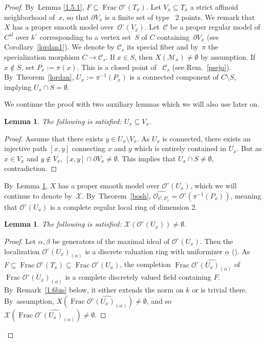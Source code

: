 \documentclass[10pt]{amsart}
\newcommand{\al}{\mathrm{al}}
\DeclareMathOperator{\Frac}{Frac}
\let\backslash\setminus
\newtheorem{lm}[thm]{Lemma}
\theoremstyle{definition}
\begin{document}
\begin{proof} By~Lemma \ref{1.5.1}, $F \subseteq \Frac \mathcal{O}^{\circ}(T_x)$. Let $V_x \subseteq T_x$ a strict affinoid neighborhood of~$x$, so that $\partial{V_x}$ is a finite set of type ~2 points. We remark that $X$ has a proper smooth model over~$\mathcal{O}^{\circ}(V_x)$.
Let~$\mathscr{C}$ be a proper regular model of $C^{\al}$ over $k^{\circ}$ corresponding to a vertex set~$S$ of $C$ containing~$\partial{V_x}$ (see Corollary~\ref{lordan1}). We denote by $\mathscr{C}_s$ its special fiber and by~$\pi$ the specialization morphism $C \to \mathscr{C}_s$. If $x \in S$, then $X(\mathscr{M}_x) \neq \emptyset$ by assumption. If $x \not \in S$, set $P_x:=\pi(x)$. This is a closed point of ~$\mathscr{C}_s$ (see Rem.~\ref{psejo}). By~Theo\-rem~\ref{lordan}, $U_x:=\pi^{-1}(P_x)$ is a connected component of $C \backslash S$, implying \hbox{$U_x \cap S =\emptyset$}.

We continue the proof with two auxiliary lemmas which we will also use later on.

\begin{lm} \label{ekstra}
The following is satisfied: $U_x \subseteq V_x$.
\end{lm}

\begin{proof}
Assume that there exists $y \in U_x \backslash V_x$. As $U_x$ is connected, there exists an injective path $[x,y]$ connecting $x$ and $y$ which is entirely contained in $U_x$. But as $x \in V_x$ and $y \not \in V_x$, $[x,y] \cap \partial{V_x} \neq \emptyset$. This implies that $U_x \cap S \neq \emptyset$, contradiction.
\end{proof}

By~Lemma \ref{ekstra}, $X$ has a proper smooth model over $\mathcal{O}^{\circ}(U_x)$, which we will continue to denote by~$\mathcal{X}$. By~Theorem~\ref{bosh}, $\widehat{\mathcal{O}_{\mathscr{C}, P_x}}=\mathcal{O}^{\circ}(\pi^{-1}(P_x))$, meaning that $\mathcal{O}^{\circ}(U_x)$ is a complete regular local ring of dimension 2.

\begin{lm} \label{1.5.2}
The following is satisfied: $\mathcal{X}(\mathcal{O}^{\circ}(U_x)) \neq \emptyset$.
\end{lm}

\begin{proof} Let $\alpha, \beta$ be generators of the maximal ideal of $\mathcal{O}^{\circ}(U_x)$. Then the localization $\mathcal{O}^{\circ}(U_x)_{(\alpha)}$ is a discrete valuation ring with uniformizer $\alpha$ (\cite[Tag\,0AFS]{stacks}). As~$F \subseteq \Frac \mathcal{O}^{\circ}(T_x) \subseteq \Frac \mathcal{O}^{\circ}(U_x)$, the completion $\Frac \widehat{\mathcal{O}^{\circ}(U_x)_{(\alpha)}}$ of $\Frac \mathcal{O}^{\circ}(U_x)_{(\alpha)}$ is a complete discretely valued field containing $F$. By~Remark~\ref{1.6bis} below, it either extends the norm on $k$ or is trivial there. By~assumption, $X(\Frac \widehat{\mathcal{O}^{\circ}(U_x)_{(\alpha)}}) \neq \emptyset$, and so $\mathcal{X}(\Frac \widehat{\mathcal{O}^{\circ}(U_x)_{(\alpha)}}) \neq \emptyset$.


\end{proof}
\end{proof}
\end{document}
